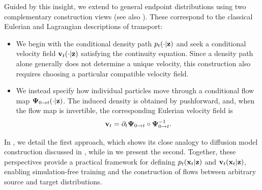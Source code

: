 
Guided by this insight, we extend to general endpoint distributions using
two complementary construction views (see also
). These correspond to the classical
Eulerian and Lagrangian descriptions of transport:

\begin{itemize}
    \item {}
    We begin with the conditional density path
    $p_t(\cdot|{\mathbf{z}})$ and seek a conditional velocity field
    ${\mathbf{v}}_t(\cdot|{\mathbf{z}})$ satisfying the continuity equation. Since a
    density path alone generally does not determine a unique velocity,
    this construction also requires choosing a particular compatible
    velocity field.

    \item {}
    We instead specify how individual particles move through a conditional
    flow map ${\bm{\Psi}}_{0\to t}(\cdot|{\mathbf{z}})$. The induced density is obtained
    by pushforward, and, when the flow map is invertible, the corresponding
    Eulerian velocity field is
    \[
    {\mathbf{v}}_t
    =
    \partial_t{\bm{\Psi}}_{0\to t}
    \circ
    {\bm{\Psi}}_{0\to t}^{-1}.
    \]
\end{itemize}


In , we detail the first approach, which shows its close analogy to diffusion model construction discussed in , while in  we present the second. Together, these perspectives provide a practical framework for defining $p_t({\mathbf{x}}_t| {\mathbf{z}})$ and ${\mathbf{v}}_t({\mathbf{x}}_t| {\mathbf{z}})$, enabling simulation-free training and the construction of flows between arbitrary source and target distributions.





